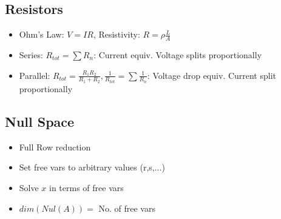\documentclass{article}\usepackage{amsmath,amssymb,amsthm,tikz,tkz-graph,color,chngpage,soul,hyperref,csquotes,graphicx,floatrow}\newcommand*{\QEDB}{\hfill\ensuremath{\square}}\newtheorem*{prop}{Proposition}\renewcommand{\theenumi}{\alph{enumi}}\usepackage[shortlabels]{enumitem}\usepackage[nobreak=true]{mdframed}\usetikzlibrary{matrix,calc}\MakeOuterQuote{"}\usepackage[margin=0.75in]{geometry} \newtheorem{theorem}{Theorem}
\begin{document}
\subsection*{Resistors}
\begin{itemize}
    \item Ohm's Law: $V=IR$, Resistivity: $R=\rho\frac{L}{A}$
    \item Series: $R_{tot} = \sum R_n$: Current equiv. Voltage splits proportionally
    \item Parallel: $R_{tot} = \frac{R_1R_2}{R_1+R_2}, \frac{1}{R_{tot}} = \sum\frac{1}{R_n}$: Voltage drop equiv. Current split proportionally
\end{itemize}
\subsection*{Null Space}
\begin{itemize}
    \item Full Row reduction
    \item Set free vars to arbitrary values (r,s,...)
    \item Solve $x$ in terms of free vars
    \item $dim(Nul(A)) =$ No. of free vars
\end{itemize}
\end{document}
